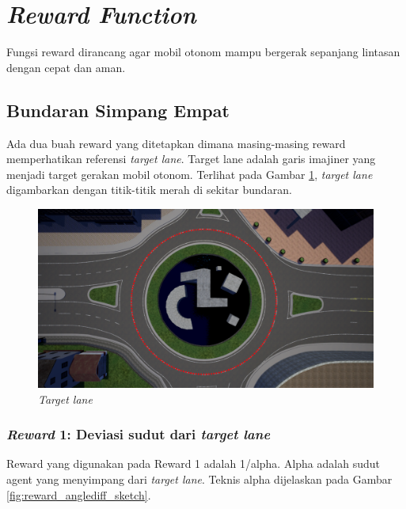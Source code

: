 \section{\textit{Reward Function}}
\label{sec:sistem_reward}

Fungsi reward dirancang agar mobil otonom mampu bergerak sepanjang lintasan dengan cepat dan aman.

\subsection{Bundaran Simpang Empat}Ada dua buah reward yang ditetapkan dimana masing-masing reward memperhatikan referensi \textit{target lane}. Target lane adalah garis imajiner yang menjadi target gerakan mobil otonom. Terlihat pada Gambar \ref{fig:target_lane_line}, \textit{target lane} digambarkan dengan titik-titik merah di sekitar bundaran.

\begin{figure}[H] 
	\centering
	\includegraphics[width=1\linewidth]{images/target_lane_line}
	\caption{\textit{Target lane}}
	\label{fig:target_lane_line}
\end{figure}

\subsubsection{\textit{Reward} 1: Deviasi sudut dari \textit{target lane}}
Reward yang digunakan pada Reward 1 adalah 1/alpha. Alpha adalah sudut agent yang menyimpang dari \textit{target lane}. Teknis alpha dijelaskan pada Gambar \ref{fig:reward_anglediff_sketch}. 

